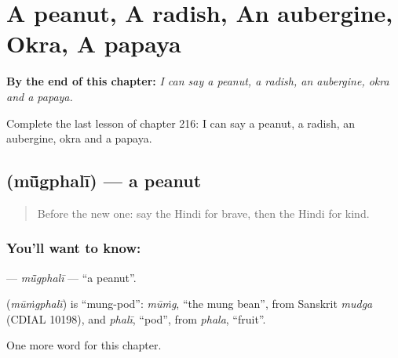 
\chapter{A peanut, A radish, An aubergine, Okra, A papaya}
\label{ch:hi-a-peanut-a-radish-an-aubergine-okra-a-papaya}

\begin{chapteropening}
\textbf{By the end of this chapter:} \emph{I can say a peanut, a radish, an aubergine, okra and a papaya.}

Complete the last lesson of chapter 216: I can say a peanut, a radish, an aubergine, okra and a papaya.
\end{chapteropening}

\section[\texorpdfstring{\hi{मूँगफली} (mū̃gphalī)}{मूँगफली (mū̃gphalī)}]{ (mū̃gphalī) — a peanut}

\label{lesson:HI-C216-mugphali}



\begin{quote}
Before the new one: say the Hindi for brave, then the Hindi for kind.
\end{quote}

\subsection*{You'll want to know: }
\textbf{} — \emph{mū̃gphalī} — \textquotedblleft{}a peanut\textquotedblright{}.

\begin{cousinweb}
\textbf{} (\emph{mūṁgphalī}) is \textquotedblleft{}mung-pod\textquotedblright{}: \emph{mūṁg}, \textquotedblleft{}the mung bean\textquotedblright{}, from Sanskrit \emph{mudga} (CDIAL 10198), and \emph{phalī}, \textquotedblleft{}pod\textquotedblright{}, from \emph{phala}, \textquotedblleft{}fruit\textquotedblright{}.
\end{cousinweb}

\begin{grammarlens}[title={What you've built}]
One more word for this chapter.
\end{grammarlens}

